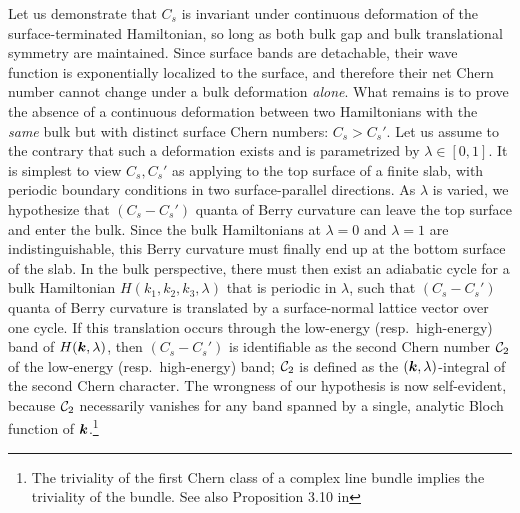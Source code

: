 \documentclass[aps,prl,showpacs,twocolumn,superscriptaddress]{revtex4-1}
\begin{document}
Let us demonstrate that $C_s$ is invariant under continuous deformation of the surface-terminated Hamiltonian, so long as both bulk gap and bulk translational symmetry are maintained. Since surface bands are detachable, their wave function is exponentially localized to the surface, and therefore their net Chern number cannot change under a bulk deformation \textit{alone}. What remains is to prove the absence of a continuous deformation between two Hamiltonians with the \textit{same} bulk but with distinct  surface Chern numbers: $C_s>C_s'$. Let us assume to the contrary that  such a deformation exists and is parametrized by $\lambda \in [0,1]$. It is simplest to view $C_s,C_s'$ as applying to the top surface of a finite slab, with periodic boundary conditions in two surface-parallel directions. As $\lambda$ is varied,  we hypothesize that $(C_s-C_s')$ quanta of Berry curvature can leave the top surface and enter the bulk.\cite{maryam_adiabaticpumpCSA,olsen_surfacetheoremCSA} Since the bulk Hamiltonians at $\lambda{=}0$ and $\lambda{=}1$ are indistinguishable, this Berry curvature must finally end up at the bottom surface of the slab. In the bulk perspective, there must then exist an adiabatic cycle for a bulk Hamiltonian  $H(k_1,k_2,k_3,\lambda)$ that is periodic in $\lambda$, such that $(C_s-C_s')$ quanta of Berry curvature is translated by a surface-normal lattice vector over one cycle. If this translation occurs through the low-energy (resp.\ high-energy)  band of $H(\boldsymbol{k},\lambda)$, then $(C_s-C_s')$ is identifiable as the second Chern number ${\cal C}_2$ of the low-energy (resp.\ high-energy) band; ${\cal C}_2$ is defined\cite{qi_topologicalfieldtheory} as the $(\boldsymbol{k},\lambda)$-integral of the second Chern character. The wrongness of our hypothesis is now self-evident, because ${\cal C}_2$ necessarily vanishes for any band spanned by a single, analytic Bloch function of $\boldsymbol{k}$.\footnote{The triviality of the first Chern class of a complex line bundle implies the triviality of the bundle.\cite{weil_varieties} See also Proposition 3.10 in }

\end{document}
